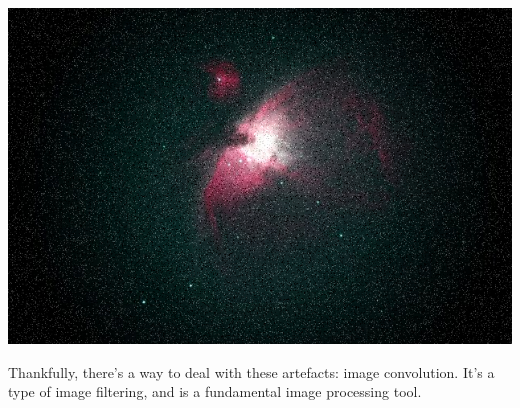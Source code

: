 \includegraphics[width=\textwidth * 5/10]{images/orion-noise.png}


Thankfully, there's a way to deal with these artefacts: image convolution. It's a type of image filtering, and is a fundamental image processing tool.

